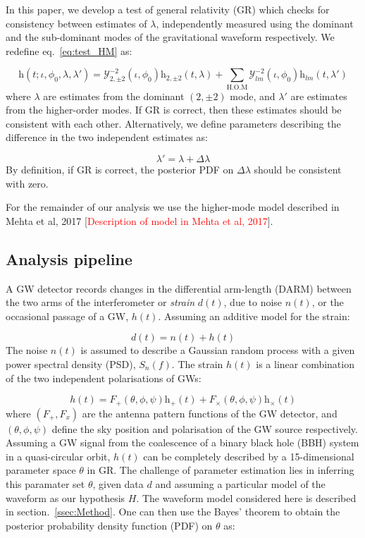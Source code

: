 \documentclass[prd,preprintnumbers,twocolumn,eqsecnum,floatfix,a4paper,nofootinbib,superscriptaddress]{revtex4}
\begin{document}
In this paper, we develop a test of general relativity (GR) which checks for consistency between estimates of $\lambda$, independently measured using the dominant and the sub-dominant modes of the gravitational waveform respectively. We redefine eq.~\ref{eq:test_HM} as:

\begin{equation}
\mathrm{h}(t; \iota, \phi_0, \lambda, \lambda') = \mathcal{Y}_{2,\pm 2}^{-2} (\iota, \phi_0)\mathrm{h}_{2,\pm 2}(t, \lambda) + \sum _{\text{H.O.M}} \mathcal{Y}_{lm}^{-2} (\iota, \phi_0)\mathrm{h}_{lm}(t, \lambda')
\end{equation}
where $\lambda$ are estimates from the dominant $(2,\pm 2)$ mode, and $\lambda'$ are estimates from the higher-order modes. If GR is correct, then these estimates should be consistent with each other. Alternatively, we define parameters describing the difference in the two independent estimates as:

\begin{equation}
\lambda ' = \lambda + \Delta \lambda
\end{equation}
By definition, if GR is correct, the posterior PDF on $\Delta \lambda$ should be consistent with zero.

For the remainder of our analysis we use the higher-mode model described in Mehta et al, 2017 [\textcolor{red}{Description of model in Mehta et al, 2017}].


\subsection{Analysis pipeline}
A GW detector records changes in the differential arm-length (DARM) between the two arms of the interferometer or \emph{strain} $d(t)$, due to noise $n(t)$, or the occasional passage of a GW, $h(t)$. Assuming an additive model for the strain:

\begin{equation}
d(t) = n(t) + h(t)
\label{eq:detector_strain}
\end{equation}
The noise $n(t)$ is assumed to describe a Gaussian random process with a given power spectral density (PSD), $S_n(f)$. The strain $h(t)$ is a linear combination of the two independent polarisations of GWs:

\begin{equation}
h(t) = F_+(\theta, \phi, \psi)\mathrm{h}_+(t) + F_{\times}(\theta, \phi, \psi)\mathrm{h}_{\times}(t)
\end{equation}
where $(F_+, F_x)$ are the antenna pattern functions of the GW detector, and $(\theta, \phi, \psi)$ define the sky position and polarisation of the GW source respectively. Assuming a GW signal from the coalescence of a binary black hole (BBH) system in a quasi-circular orbit, $h(t)$ can be completely described by a 15-dimensional parameter space $\theta$ in GR. The challenge of parameter estimation lies in inferring this paramater set $\theta$, given data $d$ and assuming a particular model of the waveform as our hypothesis $H$. The waveform model considered here is described in section.~\ref{ssec:Method}. One can then use the Bayes' theorem to obtain the posterior probability density function (PDF) on $\theta$ as:
\end{document}
